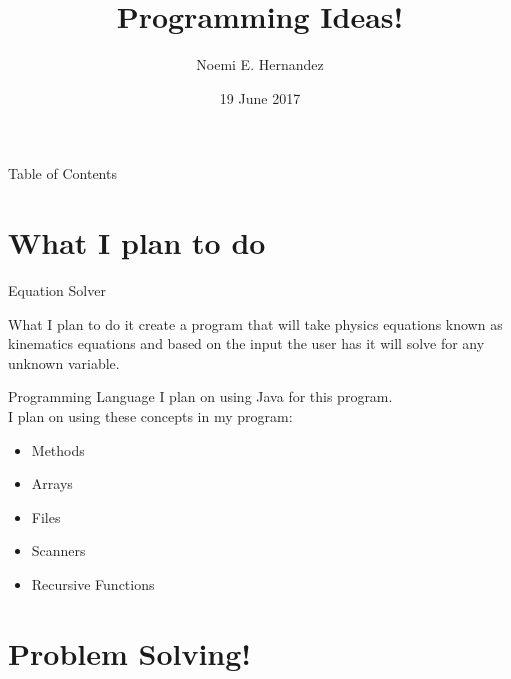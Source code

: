 \documentclass{beamer}
\title{Programming Ideas!}
\author{Noemi E. Hernandez}
\institute{University of Texas at El Paso}
\date{19 June 2017}
\begin{document}
	\maketitle
	\begin{frame}{Table of Contents}
		\tableofcontents 
	\end{frame}
	\transboxin	

	\section{What I plan to do}
		\begin{frame}{Equation Solver}
			\begin{center}
				What I plan to do it create a program that will take physics equations known as kinematics equations and based on the input the user has it will solve for any unknown variable.
			\end{center}
		\end{frame}
	\transblindsvertical
		\begin{frame}{Programming Language}
				I plan on using Java for this program.\\
				I plan on using these concepts in my program:
			\begin{center}
				\begin{itemize}
					\item Methods
					\item Arrays
					\item Files
					\item Scanners
					\item Recursive Functions
				\end{itemize}
			\end{center}
					
		\end{frame}
	\transglitter
		
	\section{Problem Solving!}
\end{document}
